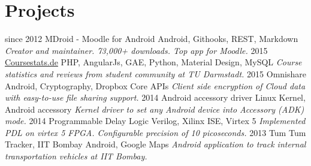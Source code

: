 \documentclass[]{friggeri-cv}
\begin{document}
\section{Projects}
\begin{entrylist}
  \entry
    {since 2012}
    {MDroid - Moodle for Android}
    {Android, Githooks, REST, Markdown}
    {\emph{Creator and maintainer. 73,000+ downloads. Top app for Moodle.}}
  \entry
    {2015}
    {\href{https://coursestats.de}{Coursestats.de}}
    {PHP, AngularJs, GAE, Python, Material Design, MySQL}
    {\emph{Course statistics and reviews from student community at TU Darmstadt.}}
  \entry
    {2015}
    {Omnishare}
    {Android, Cryptography, Dropbox Core APIs}
    {\emph{Client side encryption of Cloud data with easy-to-use file sharing support.}}
  \entry
    {2014}
    {Android accessory driver}
    {Linux Kernel, Android accessory}
    {\emph{Kernel driver to set any Android device into Accessory (ADK) mode.}}
  \entry
    {2014}
    {Programmable Delay Logic}
    {Verilog, Xilinx ISE, Virtex 5}
    {\emph{Implemented PDL on virtex 5 FPGA. Configurable precision of 10 picoseconds.}}
  \entry
    {2013}
    {Tum Tum Tracker, IIT Bombay}
    {Android, Google Maps}
    {\emph{Android application to track internal transportation vehicles at IIT Bombay.}}
\end{entrylist}
\end{document}
